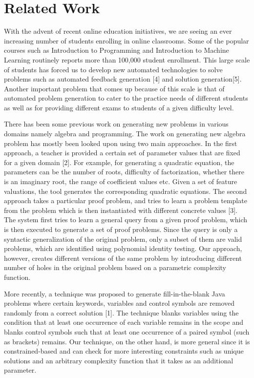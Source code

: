 \section{Related Work}

With the advent of recent online education initiatives, we are seeing an ever increasing number of students enrolling in online classrooms. Some of the popular courses such as Introduction to Programming and Introduction to Machine Learning routinely reports more than 100,000 student enrollment. This large scale of students has forced us to develop new automated technologies to solve problems such as automated feedback generation [4] and solution generation[5]. Another important problem that comes up because of this scale is that of automated problem generation to cater to the practice needs of different students as well as for providing different exams to students of a given difficulty level.

There has been some previous work on generating new problems in various domains namely algebra and programming. The work on generating new algebra problem has mostly been looked upon using two main approaches. In the first approach, a teacher is provided a certain set of parameter values that are fixed for a given domain [2]. For example, for generating a quadratic equation, the parameters can be the number of roots, difficulty of factorization, whether there is an imaginary root, the range of coefficient values etc. Given a set of feature valuations, the tool generates the corresponding quadratic equations. The second approach takes a particular proof problem, and tries to learn a problem template from the problem which is then instantiated with different concrete values [3]. The system first tries to learn a general query from a given proof problem, which is then executed to generate a set of proof problems. Since the query is only a syntactic generalization of the original problem, only a subset of them are valid problems, which are identified using polynomial identity testing. Our approach, however, creates different versions of the same problem by introducing different number of holes in the original problem based on a parametric complexity function.

More recently, a technique was proposed to generate fill-in-the-blank Java problems where certain keywords, variables and control symbols are removed randomly from a correct solution [1]. The technique blanks variables using the condition that at least one occurrence of each variable remains in the scope and blanks control symbols such that at least one occurrence of a paired symbol (such as brackets) remains. Our technique, on the other hand, is more general since it is constrained-based and can check for more interesting constraints such as unique solutions and an arbitrary complexity function that it takes as an additional parameter.
